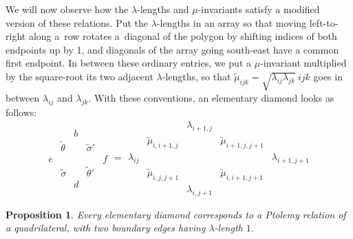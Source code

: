 \documentclass[pdftex]{sigma}
\numberwithin{equation}{section}
\newtheorem{Proposition}[Theorem]{Proposition}
 {\theoremstyle{Definition}
\newtheorem{Definition}[Theorem]{Definition}
\newtheorem{Example}[Theorem]{Example}
\newtheorem{Remark}[Theorem]{Remark}
\newtheorem{Question}[Theorem]{Question} }
\renewcommand{\l}[2]{\lambda_{#1#2}}
\begin{document}
We will now observe how the $\lambda$-lengths and $\mu$-invariants satisfy a modified version of these relations.
Put the $\lambda$-lengths in an array so that moving left-to-right along a~row rotates a~diagonal of the polygon
by shifting indices of both endpoints up by 1, and diagonals of the array going south-east have a common first endpoint.
In between these ordinary entries, we put a $\mu$-invariant multiplied by the square-root its two adjacent $\lambda$-lengths, so that $\tilde \mu_{ijk} = \sqrt{\l i j\l j k}\ \boxed{ijk}$ goes in between $\lambda_{ij}$ and $\lambda_{jk}$.
With these conventions, an elementary diamond looks as follows:
\[
 \begin{array}{ccccc}
 & & b & & \\
 & \tilde\theta & & \tilde\sigma' & \\
 e & & & & f \\
 & \tilde\sigma & & \tilde\theta' & \\
 & & d & &
 \end{array}
 =
 \begin{array}{ccccc}
 & & \lambda_{i+1,j} & & \\
 & \tilde \mu_{i,i+1,j} & & \tilde \mu_{i+1,j,j+1} & \\
 \lambda_{ij} & & & & \lambda_{i+1,j+1} \\
 &\tilde \mu_{i,j,j+1} & & \tilde\mu_{i,i+1,j+1} & \\
 & & \lambda_{i,j+1} & &
 \end{array}
\]
\begin{Proposition}\label{prop:frieze-mutation}
Every elementary diamond corresponds to a Ptolemy relation of a quadri\-la\-teral, with two boundary edges having $\lambda$-length $1$.	
\end{Proposition}
\end{document}
